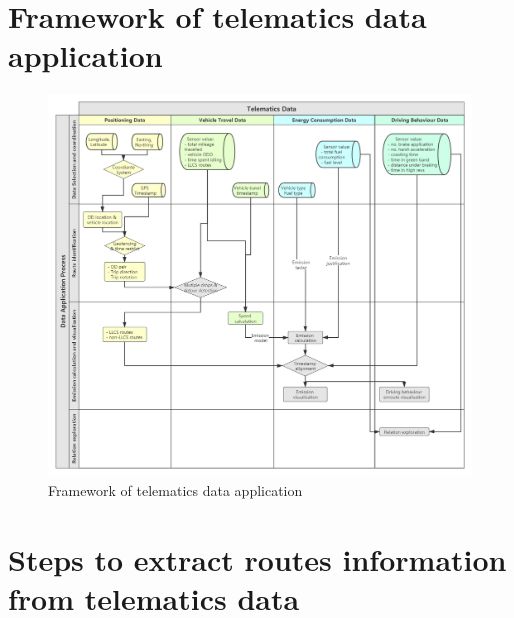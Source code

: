 \documentclass[preprint,12pt,3p]{elsarticle}
\begin{document}
\clearpage
\appendix
\section{Framework of telematics data application}

\begin{figure}[H] %
\centering %
\includegraphics[width=1\textwidth]{LLCS telematics data utilisation framework.png} %
\caption{Framework of telematics data application} %
\label{Fig1} %
\end{figure}


\section{Steps to extract routes information from telematics data}
\end{document}
